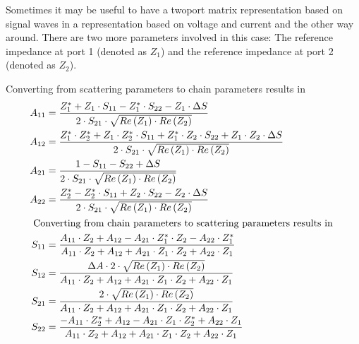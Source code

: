 Sometimes it may be useful to have a twoport matrix representation
based on signal waves in a representation based on voltage and current
and the other way around.  There are two more parameters involved in
this case: The reference impedance at port 1 (denoted as $Z_1$) and
the reference impedance at port 2 (denoted as $Z_2$).

\addvspace{12pt}

Converting from scattering parameters to chain parameters results in
\begin{align}
A_{11} &= \dfrac{Z_{1}^{*} + Z_{1}\cdot S_{11} - Z_{1}^{*}\cdot S_{22} - Z_{1}\cdot \Delta S}{2\cdot S_{21}\cdot \sqrt{Re\left(Z_{1}\right)\cdot Re\left(Z_{2}\right)}}\\
A_{12} &= \dfrac{Z_{1}^{*}\cdot Z_{2}^{*} + Z_{1}\cdot Z_{2}^{*}\cdot S_{11} + Z_{1}^{*}\cdot Z_{2}\cdot S_{22} + Z_{1}\cdot Z_{2}\cdot \Delta S}{2\cdot S_{21}\cdot \sqrt{Re\left(Z_{1}\right)\cdot Re\left(Z_{2}\right)}}\\
A_{21} &= \dfrac{1 - S_{11} - S_{22} + \Delta S}{2\cdot S_{21}\cdot \sqrt{Re\left(Z_{1}\right)\cdot Re\left(Z_{2}\right)}}\\
A_{22} &= \dfrac{Z_{2}^{*} - Z_{2}^{*}\cdot S_{11} + Z_{2}\cdot S_{22} - Z_{2}\cdot \Delta S}{2\cdot S_{21}\cdot \sqrt{Re\left(Z_{1}\right)\cdot Re\left(Z_{2}\right)}}\\
\intertext{
Converting from chain parameters to scattering parameters results in
}
S_{11} &= \dfrac{A_{11}\cdot Z_{2} + A_{12} - A_{21}\cdot Z_{1}^{*}\cdot Z_{2} - A_{22}\cdot Z_{1}^{*}}{A_{11}\cdot Z_{2} + A_{12} + A_{21}\cdot Z_{1}\cdot Z_{2} + A_{22}\cdot Z_{1}}\\
S_{12} &= \dfrac{\Delta A\cdot 2\cdot \sqrt{Re\left(Z_{1}\right)\cdot Re\left(Z_{2}\right)}}{A_{11}\cdot Z_{2} + A_{12} + A_{21}\cdot Z_{1}\cdot Z_{2} + A_{22}\cdot Z_{1}}\\
S_{21} &= \dfrac{2\cdot \sqrt{Re\left(Z_{1}\right)\cdot Re\left(Z_{2}\right)}}{A_{11}\cdot Z_{2} + A_{12} + A_{21}\cdot Z_{1}\cdot Z_{2} + A_{22}\cdot Z_{1}}\\
S_{22} &= \dfrac{-A_{11}\cdot Z_{2}^{*} + A_{12} - A_{21}\cdot Z_{1}\cdot Z_{2}^{*} + A_{22}\cdot Z_{1}}{A_{11}\cdot Z_{2} + A_{12} + A_{21}\cdot Z_{1}\cdot Z_{2} + A_{22}\cdot Z_{1}}
\end{align}

